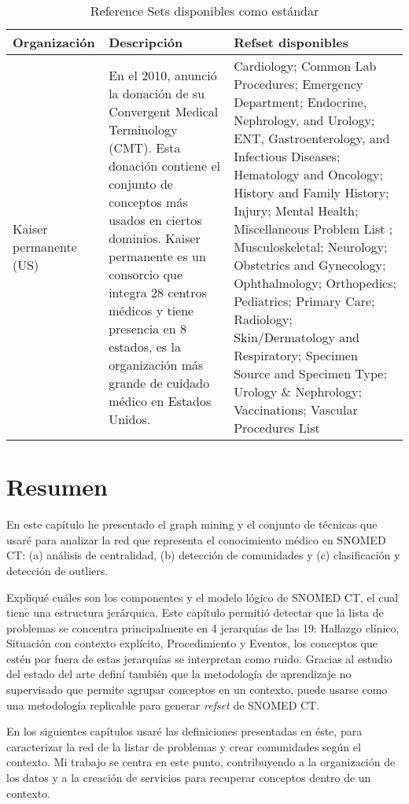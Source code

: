 \begin{table}[htb]
\caption{Reference Sets disponibles como estándar}
\label{refsetsSnomed}
\begin{tabularx}{\textwidth}{@{}XXX@{}}
\toprule
Organización & Descripción & Refset disponibles \\ \midrule
Kaiser permanente (US) & En el 2010, anunció la donación de su Convergent Medical Terminology (CMT). Esta donación contiene el conjunto de conceptos más usados en ciertos dominios. Kaiser permanente es un consorcio que integra 28 centros médicos y tiene presencia en 8 estados, es la organización más grande de cuidado médico en Estados Unidos. & Cardiology; Common Lab Procedures; Emergency Department; Endocrine,  Nephrology, and Urology; ENT, Gastroenterology, and Infectious Diseases; Hematology and Oncology; History and Family History; Injury; Mental Health; Miscellaneous Problem List ; Musculoskeletal; Neurology; Obstetrics and Gynecology; Ophthalmology; Orthopedics; Pediatrics; Primary Care; Radiology; Skin/Dermatology and Respiratory; Specimen Source and Specimen Type; Urology \& Nephrology; Vaccinations; Vascular Procedures List \\
\bottomrule
\end{tabularx}
\end{table}

\section{Resumen}
En este capítulo he presentado el graph mining y el conjunto de técnicas que usaré para analizar la red que representa el conocimiento médico en SNOMED CT: (a) análisis de centralidad, (b) detección de comunidades y (c) clasificación y detección de outliers.

Expliqué cuáles son los componentes y el modelo lógico de SNOMED CT, el cual tiene una estructura jerárquica. Este capítulo permitió detectar que la lista de problemas se concentra principalmente en 4 jerarquías de las 19: Hallazgo clínico, Situación con contexto explícito, Procedimiento y Eventos, los conceptos que estén por fuera de estas jerarquías se interpretan como ruido.
Gracias al estudio del estado del arte definí también que la metodología de aprendizaje no supervisado que  permite agrupar conceptos en un contexto, puede usarse como una metodología replicable para generar \textit{refset} de SNOMED CT.

En los siguientes capítulos usaré las definiciones presentadas en éste, para caracterizar la red de la listar de problemas y crear comunidades según el contexto. Mi trabajo se centra en este punto, contribuyendo a la organización de los datos y a la creación de servicios para recuperar conceptos dentro de un contexto.
